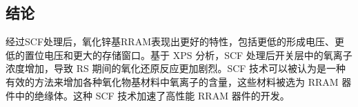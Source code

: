 
\subsection{结论}

经过SCF处理后，氧化锌基RRAM表现出更好的特性，包括更低的形成电压、更低的置位电压和更大的存储窗口。基于 XPS 分析，SCF 处理后开关层中的氧离子浓度增加，导致 RS 期间的氧化还原反应更加剧烈。SCF 技术可以被认为是一种有效的方法来增加各种氧化物基材料中氧离子的含量，这些材料被选为 RRAM 器件中的绝缘体。这种 SCF 技术加速了高性能 RRAM 器件的开发。

